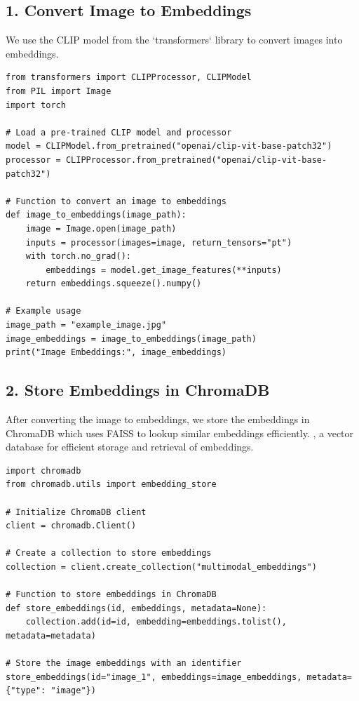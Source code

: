 \subsection*{1. Convert Image to Embeddings}

We use the CLIP model from the `transformers` library to convert images into
embeddings.

\begin{lstlisting}
from transformers import CLIPProcessor, CLIPModel
from PIL import Image
import torch

# Load a pre-trained CLIP model and processor
model = CLIPModel.from_pretrained("openai/clip-vit-base-patch32")
processor = CLIPProcessor.from_pretrained("openai/clip-vit-base-patch32")

# Function to convert an image to embeddings
def image_to_embeddings(image_path):
    image = Image.open(image_path)
    inputs = processor(images=image, return_tensors="pt")
    with torch.no_grad():
        embeddings = model.get_image_features(**inputs)
    return embeddings.squeeze().numpy()

# Example usage
image_path = "example_image.jpg"
image_embeddings = image_to_embeddings(image_path)
print("Image Embeddings:", image_embeddings)
\end{lstlisting}

\subsection*{2. Store Embeddings in ChromaDB}

After converting the image to embeddings, we store the embeddings in ChromaDB which uses FAISS  to lookup similar embeddings efficiently. \cite{douze2024faisslibrary},
a vector database for efficient storage and retrieval of embeddings.

\begin{lstlisting}
import chromadb
from chromadb.utils import embedding_store

# Initialize ChromaDB client
client = chromadb.Client()

# Create a collection to store embeddings
collection = client.create_collection("multimodal_embeddings")

# Function to store embeddings in ChromaDB
def store_embeddings(id, embeddings, metadata=None):
    collection.add(id=id, embedding=embeddings.tolist(), metadata=metadata)

# Store the image embeddings with an identifier
store_embeddings(id="image_1", embeddings=image_embeddings, metadata={"type": "image"})
\end{lstlisting}

